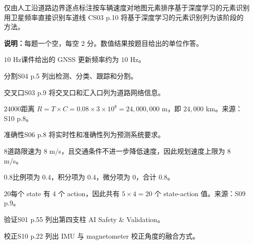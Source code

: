 {仅由人工沿道路边界逐点标注}{按车辆速度对地图元素排序}{基于深度学习的元素识别}{用卫星频率直接识别车道线}
{C}{S03 p.10 将基于深度学习的元素识别列为该阶段的方法。}

\exampagebreak
{}
\textbf{说明：}每题一个空，每空 2 分。数值结果按题目给出的单位作答。

{$10$ Hz}{课件给出的 GNSS 更新频率约为 $10$ Hz。}

{分割}{S04 p.5 列出检测、分类、跟踪和分割。}

{交叉口}{S03 p.9 将交叉口和汇入口列为道路网络信息。}

{$24000$}{距离 $R=T\times C=0.08\times3\times10^8=24{,}000{,}000$ m，即 $24{,}000$ km。来源：S10 p.8。}

{准确性}{S06 p.8 将实时性和准确性列为预测系统要求。}

{$8$}{道路限速为 $8$ m/s，且交通条件不进一步降低速度，因此规划速度上限为 $8$ m/s。}

{$0.8$}{比例项为 $0.4$，积分项为 $0.4$，微分项为 $0$，合计 $0.8$。}

{$20$}{每个 state 有 4 个 action，因此共有 $5\times4=20$ 个 state-action 值。来源：S09 p.9。}

{验证}{S01 p.55 列出第四支柱 AI Safety \& Validation。}

{校正}{S10 p.22 列出 IMU 与 magnetometer 校正角度的融合方式。}

